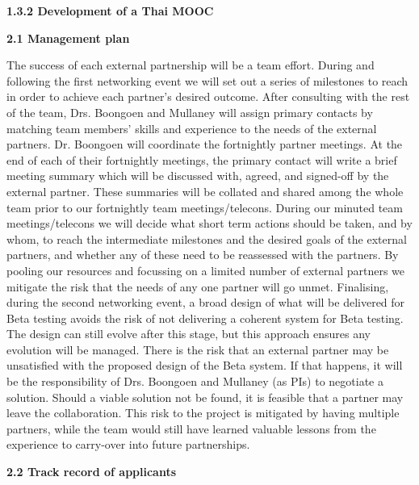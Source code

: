 \documentclass[11pt]{article}
\begin{document}
  \vspace{2mm}
  \noindent
  {\bf 1.3.2 Development of a Thai MOOC}
  

  \vspace{3mm}
  \noindent
  {\large \bf 2.1 Management plan}
    
  \noindent
  The success of each external partnership will be a team effort. During and following the first networking event we will set out a series of milestones to reach in order to achieve each partner's desired outcome. After consulting with the rest of the team, Drs. Boongoen and Mullaney will assign primary contacts by matching team members' skills and experience to the needs of the external partners. Dr. Boongoen will coordinate the fortnightly partner meetings. At the end of each of their fortnightly meetings, the primary contact will write a brief meeting summary which will be discussed with, agreed, and signed-off by the external partner. These summaries will be collated and shared among the whole team prior to our fortnightly team meetings/telecons. During our minuted team meetings/telecons we will decide what short term actions should be taken, and by whom, to reach the intermediate milestones and the desired goals of the external partners, and whether any of these need to be reassessed with the partners. By pooling our resources and focussing on a limited number of external partners we mitigate the risk that the needs of any one partner will go unmet. Finalising, during the second networking event, a broad design of what will be delivered for Beta testing avoids the risk of not delivering a coherent system for Beta testing. The design can still evolve after this stage, but this approach ensures any evolution will be managed. There is the risk that an external partner may be unsatisfied with the proposed design of the Beta system. If that happens, it will be the responsibility of Drs. Boongoen and Mullaney (as PIs) to negotiate a solution. Should a viable solution not be found, it is feasible that a partner may leave the collaboration. This risk to the project is mitigated by having multiple partners, while the team would still have learned valuable lessons from the experience to carry-over into future partnerships.
    
  \vspace{3mm}
  \noindent
  {\large \bf 2.2 Track record of applicants}
  
\end{document}

